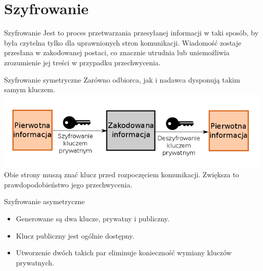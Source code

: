 \section{Szyfrowanie}

\begin{frame}
	\begin{alertblock}{Szyfrowanie}
			Jest to proces przetwarzania przesyłanej informacji w taki sposób, by była czytelna tylko dla uprawnionych stron komunikacji. Wiadomość zostaje przesłana w zakodowanej postaci, co znacznie utrudnia lub uniemożliwia zrozumienie jej treści w przypadku przechwycenia.
	\end{alertblock}
\end{frame}

\begin{frame}{Szyfrowanie symetryczne}
	Zarówno odbiorca, jak i nadawca dysponują takim samym kluczem.\\
	\vspace{\fill}
	\includegraphics[height=0.25\paperwidth]{images/priv-key.png}
	\vspace{\fill}
	Obie strony muszą znać klucz przed rozpoczęciem komunikacji. Zwiększa to prawdopodobieństwo jego przechwycenia.	
\end{frame}

\begin{frame}{Szyfrowanie asymetryczne}
		\begin{itemize}
			\item Generowane są dwa klucze, prywatny i publiczny.
			\item Klucz publiczny jest ogólnie dostępny.
			\item Utworzenie dwóch takich par eliminuje konieczność wymiany kluczów prywatnych. 
		\end{itemize}	
\end{frame}

